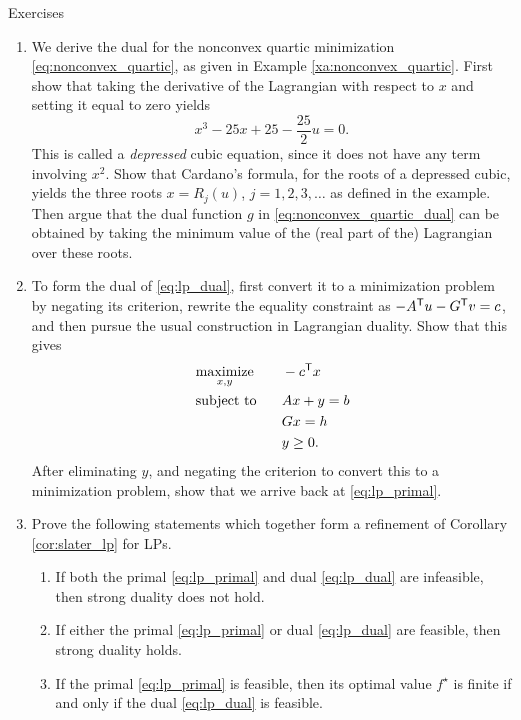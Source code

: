 \begin{xcb}{Exercises}
\begin{enumerate}[label=\thechapter.\arabic*]
\item \label{ex:nonconvex_quartic}
  We derive the dual for the nonconvex quartic minimization
  \eqref{eq:nonconvex_quartic}, as given in Example
  \ref{xa:nonconvex_quartic}. First show that taking the derivative of the  
  Lagrangian with respect to $x$ and setting it equal to zero yields 
  \[
  x^3 - 25x + 25 - \frac{25}{2} u = 0.
  \]
  This is called a \emph{depressed} cubic equation, since it does not have any 
  term involving $x^2$. Show that Cardano's formula, for the roots of a
  depressed cubic, yields the three roots $x = R_j(u)$, $j = 1,2,3,\dots$ as
  defined in the example. Then argue that the dual function $g$ in 
  \eqref{eq:nonconvex_quartic_dual} can be obtained by taking the minimum value
  of the (real part of the) Lagrangian over these roots. 

\item \label{ex:lp_dual_dual}
  To form the dual of \eqref{eq:lp_dual}, first convert it to a minimization
  problem by negating its criterion, rewrite the equality constraint as $-A^{\mathsf{T}} u
  - G^{\mathsf{T}} v = c$, and then pursue the usual construction in Lagrangian
  duality. Show that this gives    
  \begin{alignat*}{2}
  &\operatorname*{maximize}_{x,y} \quad && -c^{\mathsf{T}} x \\ 
  &\operatorname{subject\,\,to} && Ax + y = b \\
  & && Gx = h \\
  & && y \geq 0.
  \end{alignat*}
  After eliminating $y$, and negating the criterion to convert this to a
  minimization problem, show that we arrive back at \eqref{eq:lp_primal}.  

\item \label{ex:lp_slater}
  Prove the following statements which together form a refinement of Corollary
  \ref{cor:slater_lp} for LPs.  

\begin{enumerate}[label=\alph*.]
\item If both the primal \eqref{eq:lp_primal} and dual \eqref{eq:lp_dual} are
  infeasible, then strong duality does not hold.

\item If either the primal \eqref{eq:lp_primal} or dual \eqref{eq:lp_dual} are
  feasible, then strong duality holds.

\item If the primal \eqref{eq:lp_primal} is feasible, then its optimal value
  $f^\star$ is finite if and only if the dual \eqref{eq:lp_dual} is feasible.  


\end{enumerate}
\end{enumerate}
\end{xcb}
